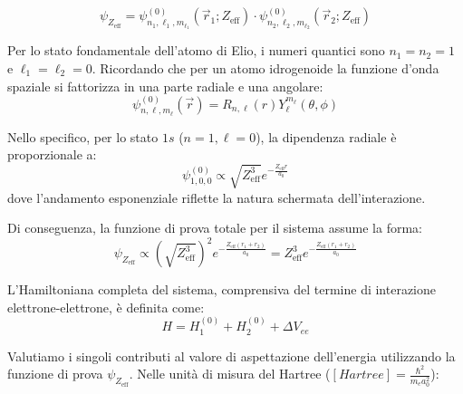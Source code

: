 \begin{equation}
    \psi_{Z_{\text{eff}}} = \psi_{n_1, \ell_1, m_{\ell_1}}^{(0)}(\vec{r}_1; Z_{\text{eff}}) \cdot \psi_{n_2, \ell_2, m_{\ell_2}}^{(0)}(\vec{r}_2; Z_{\text{eff}})
\end{equation}

Per lo stato fondamentale dell'atomo di Elio, i numeri quantici sono \(n_1 = n_2 = 1\) e \(\ell_1 = \ell_2 = 0\). Ricordando che per un atomo idrogenoide la funzione d'onda spaziale si fattorizza in una parte radiale e una angolare:
\begin{equation}
    \psi_{n, \ell, m_{\ell}}^{(0)}(\vec{r}) = R_{n, \ell}(r) Y_{\ell}^{m_{\ell}}(\theta, \phi)
\end{equation}

Nello specifico, per lo stato \(1s\) (\(n=1, \ell=0\)), la dipendenza radiale è proporzionale a:
\begin{equation}
    \psi_{1, 0, 0}^{(0)} \propto \sqrt{Z_{\text{eff}}^3} e^{-\frac{Z_{\text{eff}} r}{a_0}}
\end{equation}
dove l'andamento esponenziale riflette la natura schermata dell'interazione. 

Di conseguenza, la funzione di prova totale per il sistema assume la forma:
\begin{equation}
    \psi_{Z_{\text{eff}}} \propto \left( \sqrt{Z_{\text{eff}}^3} \right)^2 e^{-\frac{Z_{\text{eff}} (r_1 + r_2)}{a_0}} = Z_{\text{eff}}^3 e^{-\frac{Z_{\text{eff}} (r_1 + r_2)}{a_0}}
\end{equation}

L'Hamiltoniana completa del sistema, comprensiva del termine di interazione elettrone-elettrone, è definita come:
\begin{equation}
    H = H_1^{(0)} + H_2^{(0)} + \Delta V_{ee}
\end{equation}

Valutiamo i singoli contributi al valore di aspettazione dell'energia utilizzando la funzione di prova \(\psi_{Z_{\text{eff}}}\). 
Nelle unità di misura del Hartree (\([Hartree]= \frac{\hbar^2}{m_e a_0^2}\)):

